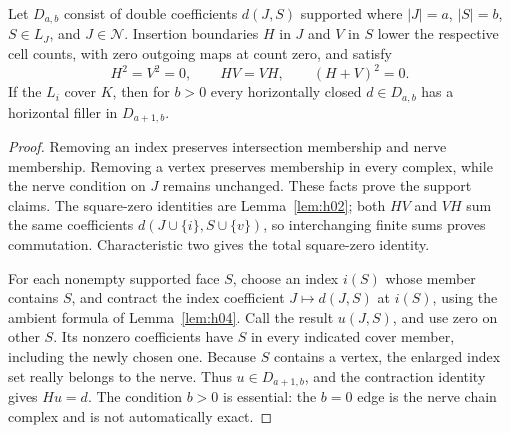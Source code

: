 \begin{lemma}\label{lem:h06}
Let \(D_{a,b}\) consist of double coefficients \(d(J,S)\) supported where
\(|J|=a\), \(|S|=b\), \(S\in L_J\), and \(J\in\mathcal N\).
Insertion boundaries \(H\) in \(J\) and \(V\) in \(S\) lower the
respective cell counts, with zero outgoing maps at count zero, and satisfy
\[
 H^2=V^2=0,\qquad HV=VH,\qquad(H+V)^2=0.
\]
If the \(L_i\) cover \(K\), then for \(b>0\) every horizontally closed
\(d\in D_{a,b}\) has a horizontal filler in \(D_{a+1,b}\).
\end{lemma}
\begin{proof}
Removing an index preserves intersection membership and nerve membership.
Removing a vertex preserves membership in every complex, while the nerve
condition on \(J\) remains unchanged. These facts prove the support claims.
The square-zero identities are Lemma~\ref{lem:h02}; both \(HV\) and
\(VH\) sum the same coefficients \(d(J\cup\{i\},S\cup\{v\})\), so
interchanging finite sums proves commutation. Characteristic two gives
the total square-zero identity.

For each nonempty supported face \(S\), choose an index \(i(S)\) whose
member contains \(S\), and contract the index coefficient
\(J\mapsto d(J,S)\) at \(i(S)\), using the ambient formula of
Lemma~\ref{lem:h04}. Call the result \(u(J,S)\), and use zero on other
\(S\). Its nonzero coefficients have \(S\) in every indicated cover
member, including the newly chosen one. Because \(S\) contains a vertex,
the enlarged index set really belongs to the nerve. Thus
\(u\in D_{a+1,b}\), and the contraction identity gives \(Hu=d\).
The condition \(b>0\) is essential: the \(b=0\) edge is the nerve
chain complex and is not automatically exact.
\end{proof}

